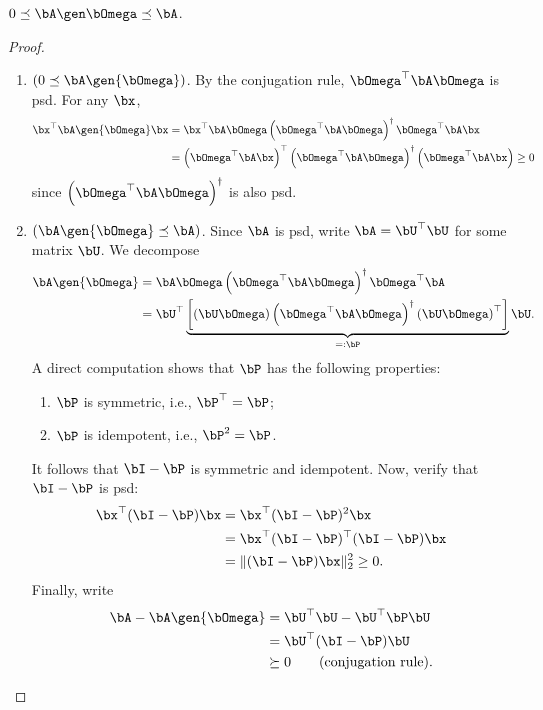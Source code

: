 
\begin{proposition}\label{prop:nystrom-order}
    $0\preceq \bA\gen\bOmega\preceq \bA$.
\end{proposition}

\begin{proof}\,
    \begin{enumerate}
    \item $(0\preceq\bA\gen{\bOmega})$. By the conjugation rule, $\bOmega^\top\bA\bOmega$ is psd. For any $\bx$,
    \begin{align*}
        \bx^\top\bA\gen{\bOmega}\bx &= \bx^\top\bA\bOmega\left(\bOmega^\top\bA\bOmega\right)^\dagger\bOmega^\top\bA\bx\\
        &=\left(\bOmega^\top\bA\bx\right)^\top \left(\bOmega^\top\bA\bOmega\right)^\dagger\left(\bOmega^\top\bA\bx\right)\geq 0
    \end{align*}
    since $\left(\bOmega^\top\bA\bOmega\right)^\dagger$ is also psd.

    \item $(\bA\gen{\bOmega}\preceq\bA)$. Since $\bA$ is psd, write $\bA = \bU^\top\bU$ for some matrix $\bU$. We decompose
    \begin{align*}
        \bA\gen{\bOmega} &= \bA\bOmega\left(\bOmega^\top\bA\bOmega\right)^\dagger\bOmega^\top\bA\\
        &= \bU^\top\underbrace{\left[\left(\bU\bOmega\right)\left(\bOmega^\top\bA\bOmega\right)^\dagger\left(\bU\bOmega\right)^\top\right]}_{=: \bP}\bU.
    \end{align*}
    A direct computation shows that $\bP$ has the following properties:
    \begin{enumerate}
        \item $\bP$ is symmetric, i.e., $\bP^\top = \bP$;
        \item $\bP$ is idempotent, i.e., $\bP^2 = \bP$.
    \end{enumerate}
   It follows that $\bI - \bP$ is symmetric and idempotent. Now, verify that $\bI - \bP$ is psd:
    \begin{align*}
        \bx^\top(\bI-\bP)\bx &= \bx^\top(\bI-\bP)^2\bx\\
        &= \bx^\top(\bI-\bP)^\top(\bI-\bP)\bx\\
        &= \|(\bI-\bP)\bx\|_2^2\geq 0.
    \end{align*}
    Finally, write
    \begin{align*}
        \bA - \bA\gen{\bOmega} &= \bU^\top\bU - \bU^\top\bP\bU\\
        &=\bU^\top (\bI - \bP)\bU\\
        &\succeq 0\qquad\text{(conjugation rule).}
    \end{align*}
    \end{enumerate}
\end{proof}

